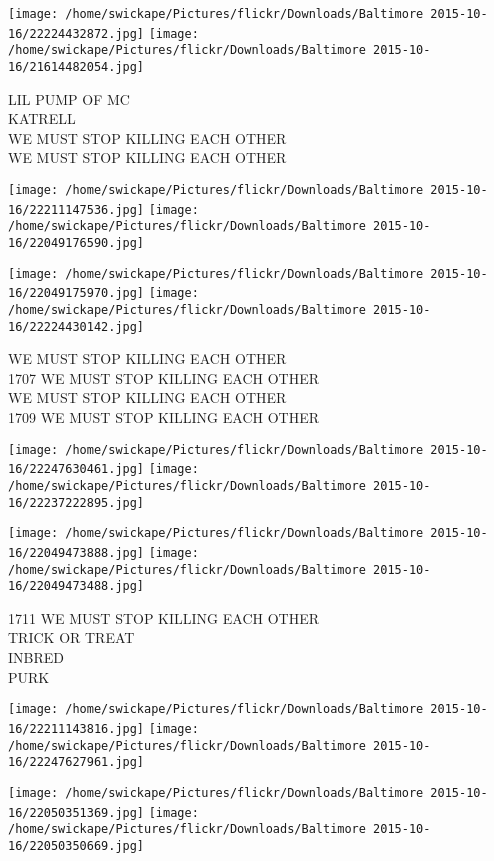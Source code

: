 \documentclass[10pt,letterpaper]{article}
\begin{document}
\texttt{[image: /home/swickape/Pictures/flickr/Downloads/Baltimore 2015-10-16/22224432872.jpg]}
\texttt{[image: /home/swickape/Pictures/flickr/Downloads/Baltimore 2015-10-16/21614482054.jpg]}

LIL PUMP OF MC\\
KATRELL\\
WE MUST STOP KILLING EACH OTHER\\
WE MUST STOP KILLING EACH OTHER
\pagebreak

\texttt{[image: /home/swickape/Pictures/flickr/Downloads/Baltimore 2015-10-16/22211147536.jpg]}
\texttt{[image: /home/swickape/Pictures/flickr/Downloads/Baltimore 2015-10-16/22049176590.jpg]}

\texttt{[image: /home/swickape/Pictures/flickr/Downloads/Baltimore 2015-10-16/22049175970.jpg]}
\texttt{[image: /home/swickape/Pictures/flickr/Downloads/Baltimore 2015-10-16/22224430142.jpg]}

WE MUST STOP KILLING EACH OTHER\\
1707 WE MUST STOP KILLING EACH OTHER\\
WE MUST STOP KILLING EACH OTHER\\
1709 WE MUST STOP KILLING EACH OTHER
\pagebreak

\texttt{[image: /home/swickape/Pictures/flickr/Downloads/Baltimore 2015-10-16/22247630461.jpg]}
\texttt{[image: /home/swickape/Pictures/flickr/Downloads/Baltimore 2015-10-16/22237222895.jpg]}

\texttt{[image: /home/swickape/Pictures/flickr/Downloads/Baltimore 2015-10-16/22049473888.jpg]}
\texttt{[image: /home/swickape/Pictures/flickr/Downloads/Baltimore 2015-10-16/22049473488.jpg]}

1711 WE MUST STOP KILLING EACH OTHER\\
TRICK OR TREAT\\
INBRED\\
PURK
\pagebreak

\texttt{[image: /home/swickape/Pictures/flickr/Downloads/Baltimore 2015-10-16/22211143816.jpg]}
\texttt{[image: /home/swickape/Pictures/flickr/Downloads/Baltimore 2015-10-16/22247627961.jpg]}

\texttt{[image: /home/swickape/Pictures/flickr/Downloads/Baltimore 2015-10-16/22050351369.jpg]}
\texttt{[image: /home/swickape/Pictures/flickr/Downloads/Baltimore 2015-10-16/22050350669.jpg]}
\end{document}
